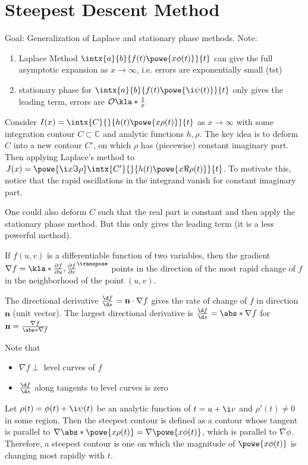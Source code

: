 \documentclass[english, parskip=full]{scrbook}
\newcommand{\definition}[2]{\begin{tcolorbox}[colback=colorbackgrounddefinition,colframe=colordefinition, breakable,enhanced,title=\textbf{#1}.]#2\end{tcolorbox}}
\newcommand{\note}[1]{\begin{tcolorbox}[colback=colorbackgroundnote,colframe=colornote, breakable,enhanced]#1\end{tcolorbox}}
\begin{document}
\section{Steepest Descent Method}
Goal: Generalization of Laplace and stationary phase methods.
Note:
\begin{enumerate}
\item Laplace Method $\intx{a}{b}{f(t)\powe{x\phi(t)}}{t}$ can give the full asymptotic expansion as $x\rightarrow\infty$, i.e. errors are exponentially small (\gls{tst})
\item stationary phase for $\intx{a}{b}{f(t) \powe{\i\psi(t)}}{t}$ only gives the leading term, errors are $\mathcal{O}\kla*{\frac{1}{x}}$
\end{enumerate}
Consider $I(x) = \intx{C}{ }{h(t)\powe{x\rho(t)}}{t}$ as $x\rightarrow\infty$ with some integration contour $C\subset \mathbb{C}$ and analytic functions $h,\rho$.
The key idea is to deform $C$ into a new contour $C'$, on which $\rho$ has (piecewise) constant imaginary part.
Then applying Laplace's method to $J(x) = \powe{\i x \Im \rho} \intx{C'}{ }{h(t)\powe{x\Re \rho(t)}}{t}$.
To motivate this, notice that the rapid oscillations in the integrand vanish for constant imaginary part.
\note{One could also deform $C$ such that the real part is constant and then apply the stationary phase method. But this only gives the leading term (it is a less powerful method).}
\definition{Steepest Descent Path}{If $f(u,v)$ is a differentiable function of two variables, then the gradient $\nabla f = \kla*{\frac{\partial f}{\partial u} ,  \frac{\partial f}{\partial v}}^\transpose$ points in the direction of the most rapid change of $f$ in the neighborhood of the point $(u,v)$.
\note{The directional derivative $\frac{\d f}{\d s} = \textbf{n} \cdot \nabla f$ gives the rate of change of $f$ in direction $\textbf{n}$ (unit vector).
The largest directional derivative is $\frac{\d f}{\d s} = \abs*{\nabla f}$ for $\textbf{n} = \frac{\nabla f}{\abs*{\nabla f}}$}
Note that 
\begin{itemize}
\item $\nabla f\perp$ level curves of $f$
\item $\frac{\d f}{\d s}$ along tangents to level curves is zero
\end{itemize}
Let $\rho(t) = \phi(t) + \i\psi(t)$ be an analytic function of $t=u+\i v$ and $\rho'(t)\neq 0$ in some region.
Then the steepest contour is defined as a contour whose tangent is parallel to $\nabla \abs*{\powe{x\rho(t)}} = \nabla \powe{x\phi(t)}$, which is parallel to $\nabla \phi$.
Therefore, a steepest contour is one on which the magnitude of $\powe{x\phi(t)}$ is changing most rapidly with $t$.
}
\end{document}

